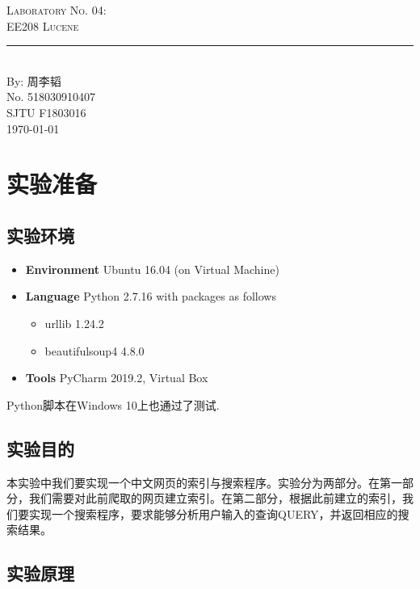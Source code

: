 \documentclass{article}
\newcommand{\labno}{04}
\newcommand{\labtitle}{EE208 Lucene}
\newcommand{\authorname}{周李韬}
\newcommand{\studentno}{518030910407}
\newcommand{\classno}{F1803016}
\begin{document}
\begin{center}
{\LARGE \textsc{Laboratory No. \labno:} \\ \vspace{4pt}}
{\Large \textsc{\labtitle} \\ \vspace{4pt}} 
\rule[13pt]{\textwidth}{1pt} \\ \vspace{15pt}
{\large By: \authorname \\ \vspace{10pt}
No. \studentno \\ \vspace{10pt}
SJTU \classno \\ \vspace{10pt}
\today \vspace{20pt}}
\end{center}



\section{实验准备}

\subsection{实验环境}
\begin{itemize}
\item\textbf{Environment} Ubuntu 16.04 (on Virtual Machine)
\item\textbf{Language} Python 2.7.16 with packages as follows
	\begin{itemize}
	\item urllib 1.24.2
	\item beautifulsoup4 4.8.0
	\end{itemize}
\item\textbf{Tools} PyCharm 2019.2, Virtual Box
\end{itemize}
Python脚本在Windows 10上也通过了测试.

\subsection{实验目的}
本实验中我们要实现一个中文网页的索引与搜索程序。实验分为两部分。在第一部分，我们需要对此前爬取的网页建立索引。在第二部分，根据此前建立的索引，我们要实现一个搜索程序，要求能够分析用户输入的查询QUERY，并返回相应的搜索结果。

\subsection{实验原理}
\label{sec:principle}
\end{document}
